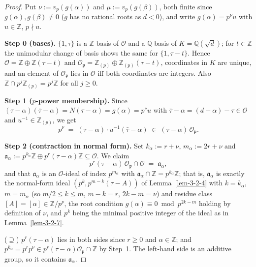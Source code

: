 \begin{proof}
  Put $\nu := v_p(g(\alpha))$ and $\mu := v_p(g(\beta))$, both finite since
  $g(\alpha), g(\beta) \neq 0$ ($g$ has no rational roots as $d < 0$), and write
  $g(\alpha) = p^{\nu}u$ with $u \in \mathbb{Z}$, $p \nmid u$.

  \textbf{Step 0 (bases).}
  $\{1, \tau\}$ is a $\mathbb{Z}$-basis of $\mathcal{O}$ and a $\mathbb{Q}$-basis of
  $K = \mathbb{Q}(\sqrt d)$; for $t \in \mathbb{Z}$ the unimodular change of basis
  shows the same for $\{1, \tau - t\}$. Hence
  $\mathcal{O} = \mathbb{Z} \oplus \mathbb{Z}(\tau - t)$ and
  $\mathcal{O}_\mathfrak{p} = \mathbb{Z}_{(p)} \oplus \mathbb{Z}_{(p)}(\tau - t)$,
  coordinates in $K$ are unique, and an element of $\mathcal{O}_\mathfrak{p}$ lies in
  $\mathcal{O}$ iff both coordinates are integers. Also
  $\mathbb{Z} \cap p^{j}\mathbb{Z}_{(p)} = p^{j}\mathbb{Z}$ for all $j \geq 0$.

  \textbf{Step 1 ($p$-power membership).}
  Since $(\tau - \alpha)(\bar\tau - \alpha) = N(\tau - \alpha) = g(\alpha) = p^{\nu}u$
  with $\bar\tau - \alpha = (d - \alpha) - \tau \in \mathcal{O}$ and
  $u^{-1} \in \mathbb{Z}_{(p)}$, we get
  \[
    p^{\nu} \;=\; (\tau - \alpha)\cdot u^{-1}(\bar\tau - \alpha)
    \;\in\; (\tau - \alpha)\,\mathcal{O}_\mathfrak{p}.
  \]

  \textbf{Step 2 (contraction in normal form).}
  Set $k_\alpha := r + \nu$, $m_\alpha := 2r + \nu$ and
  $\mathfrak{a}_\alpha := p^{k_\alpha}\mathbb{Z} \oplus p^{r}(\tau - \alpha)\mathbb{Z}
  \subseteq \mathcal{O}$. We claim
  \[
    p^r(\tau - \alpha)\,\mathcal{O}_\mathfrak{p} \cap \mathcal{O}
    \;=\; \mathfrak{a}_\alpha,
  \]
  and that $\mathfrak{a}_\alpha$ is an $\mathcal{O}$-ideal of index $p^{m_\alpha}$
  with $\mathfrak{a}_\alpha \cap \mathbb{Z} = p^{k_\alpha}\mathbb{Z}$; that is,
  $\mathfrak{a}_\alpha$ is exactly the normal-form ideal
  $(p^{k}, p^{m-k}(\tau - A))$ of Lemma~\ref{lem-3-2-4} with $k = k_\alpha$,
  $m = m_\alpha$ (so $m/2 \leq k \leq m$, $m - k = r$, $2k - m = \nu$) and residue
  class $[A] = [\alpha] \in \mathbb{Z}/p^{\nu}$, the root condition
  $g(\alpha) \equiv 0 \bmod p^{2k-m}$ holding by definition of $\nu$, and $p^{k}$
  being the minimal positive integer of the ideal as in Lemma~\ref{lem-3-2-7}.

  ($\supseteq$) $p^{r}(\tau - \alpha)$ lies in both sides since $r \geq 0$ and
  $\alpha \in \mathbb{Z}$; and $p^{k_\alpha} = p^{r}p^{\nu} \in
  p^{r}(\tau-\alpha)\mathcal{O}_\mathfrak{p} \cap \mathbb{Z}$ by Step~1. The
  left-hand side is an additive group, so it contains $\mathfrak{a}_\alpha$.


\end{proof}
